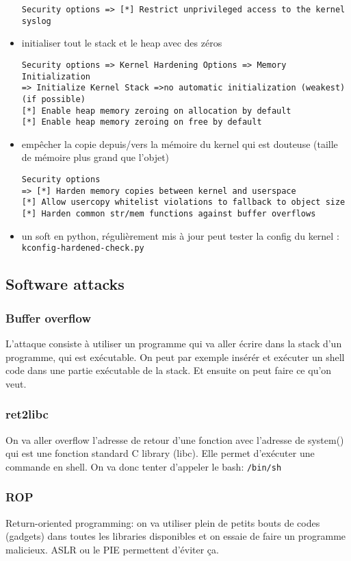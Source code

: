 \begin{itemize}
\begin{Verbatim}[breaklines=true, breakanywhere=true]
Security options => [*] Restrict unprivileged access to the kernel syslog
\end{Verbatim}
\item initialiser tout le stack et le heap avec des zéros
\begin{Verbatim}[breaklines=true, breakanywhere=true]
Security options => Kernel Hardening Options => Memory Initialization
=> Initialize Kernel Stack =>no automatic initialization (weakest) (if possible)
[*] Enable heap memory zeroing on allocation by default
[*] Enable heap memory zeroing on free by default
\end{Verbatim}
\item empêcher la copie depuis/vers la mémoire du kernel qui est douteuse (taille de mémoire plus grand que l'objet)
\begin{Verbatim}[breaklines=true, breakanywhere=true]
Security options 
=> [*] Harden memory copies between kernel and userspace
[*] Allow usercopy whitelist violations to fallback to object size
[*] Harden common str/mem functions against buffer overflows
\end{Verbatim}
\item un soft en python, régulièrement mis à jour peut tester la config du kernel : \verb!kconfig-hardened-check.py!
\end{itemize}

\subsection{Software attacks}
\subsubsection{Buffer overflow}
L'attaque consiste à utiliser un programme qui va aller écrire dans la stack d'un programme, qui est exécutable. On peut par exemple insérér et exécuter un shell code dans une partie exécutable de la stack. Et ensuite on peut faire ce qu'on veut.
\subsubsection{ret2libc}
On va aller overflow l'adresse de retour d'une fonction avec l'adresse de system() qui est une fonction standard C library (libc). Elle permet d'exécuter une commande en shell. On va donc tenter d'appeler le bash: \verb!/bin/sh!
\subsubsection{ROP}
Return-oriented programming: on va utiliser plein de petits bouts de codes (gadgets) dans toutes les libraries disponibles et on essaie de faire un programme malicieux. ASLR ou le PIE permettent d'éviter ça.
